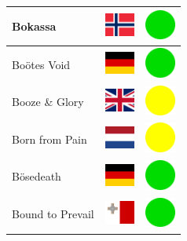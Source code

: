 \documentclass[12pt, a4paper, twoside]{report}
\begin{document}
\begin{center}
\begin{longtable}{|p{5cm}|p{2cm}|p{2cm}|}
 Bokassa                                                    & \includegraphics[width=1cm]{../4x3/no} &   \includegraphics[width=1cm]{../likes/y} \\ \hline
 Boötes Void                                                & \includegraphics[width=1cm]{../4x3/de} &   \includegraphics[width=1cm]{../likes/y} \\ \hline
 Booze \& Glory                                             & \includegraphics[width=1cm]{../4x3/gb} &   \includegraphics[width=1cm]{../likes/m} \\ \hline
 Born from Pain                                             & \includegraphics[width=1cm]{../4x3/nl} &   \includegraphics[width=1cm]{../likes/m} \\ \hline
 Bösedeath                                                  & \includegraphics[width=1cm]{../4x3/de} &   \includegraphics[width=1cm]{../likes/y} \\ \hline
 Bound to Prevail                                           & \includegraphics[width=1cm]{../4x3/mt} &   \includegraphics[width=1cm]{../likes/y} \\ \hline

\end{longtable}
\end{center}
\end{document}

